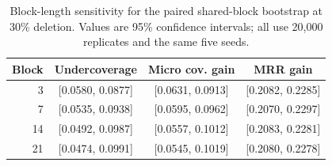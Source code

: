 \documentclass[10pt,twocolumn]{article}
\begin{document}
\begin{table}[t]
\centering
\caption{Block-length sensitivity for the paired shared-block
bootstrap at 30\% deletion. Values are 95\% confidence intervals; all use
20,000 replicates and the same five seeds.}
\label{tab:block-sensitivity}
\scriptsize
\setlength{\tabcolsep}{2pt}
\begin{tabular}{@{}rccc@{}}
\toprule
Block & Undercoverage & Micro cov. gain & MRR gain\\
\midrule
3 & [0.0580, 0.0877] & [0.0631, 0.0913] & [0.2082, 0.2285]\\
7 & [0.0535, 0.0938] & [0.0595, 0.0962] & [0.2070, 0.2297]\\
14 & [0.0492, 0.0987] & [0.0557, 0.1012] & [0.2083, 0.2281]\\
21 & [0.0474, 0.0991] & [0.0545, 0.1019] & [0.2080, 0.2278]\\
\bottomrule
\end{tabular}
\end{table}

\FloatBarrier


\end{document}
